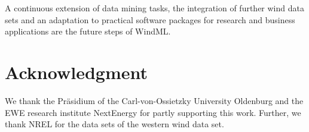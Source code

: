 \documentclass[10pt, conference, compsocconf]{IEEEtran}
\begin{document}
A continuous extension of data mining tasks, the integration of further wind data sets and an adaptation to practical software packages for research and business applications are the future steps of WindML.





\section*{Acknowledgment}

We thank the Pr\"{a}sidium of the Carl-von-Ossietzky University Oldenburg and the EWE research institute NextEnergy for partly supporting this work. Further, we thank NREL for the data sets of the western wind data set.







\end{document}
